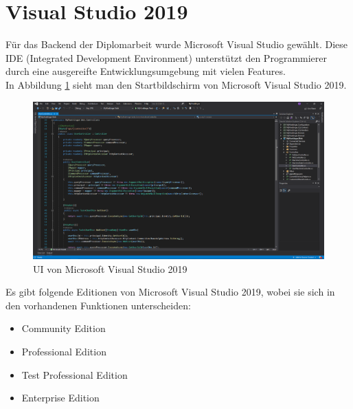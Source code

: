 \section{Visual Studio 2019}

Für das Backend der Diplomarbeit wurde Microsoft Visual Studio gewählt. Diese IDE (Integrated Development Environment) unterstützt den Programmierer durch eine ausgereifte Entwicklungsumgebung mit vielen Features.\\
\newpage
In Abbildung \ref{fig:visualStudioStartview} sieht man den Startbildschirm von Microsoft Visual Studio 2019.
\begin{figure}[H]
	\centerline{
		\includegraphics[width=1\textwidth, frame]{./grafiken/visual_studio_startview.png}
	}
	\vskip0pt
	\caption{UI von Microsoft Visual Studio 2019} \label{fig:visualStudioStartview}
\end{figure}

Es gibt folgende Editionen von Microsoft Visual Studio 2019, wobei sie sich in den vorhandenen Funktionen unterscheiden:
\begin{itemize}
	\item Community Edition
	\item Professional Edition
	\item Test Professional Edition
	\item Enterprise Edition
\end{itemize}


